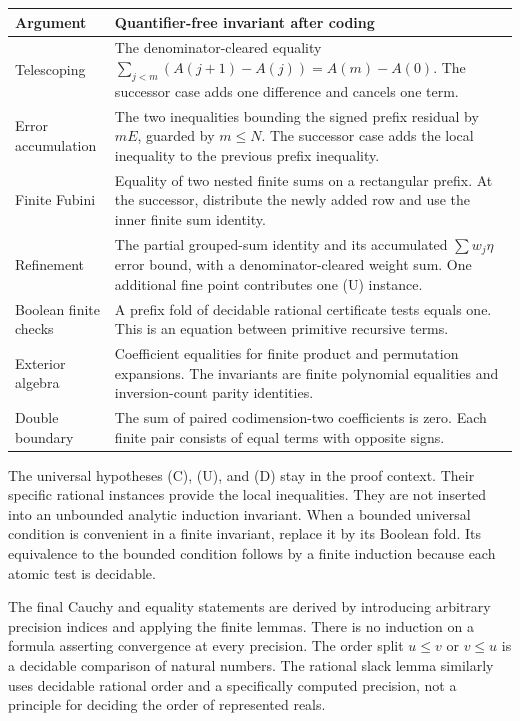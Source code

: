 \begin{longtable}{>{\raggedright\arraybackslash}p{}p{}}
\toprule
Argument & Quantifier-free invariant after coding\\
\midrule
\endhead
Telescoping &
The denominator-cleared equality
$\sum_{j<m}(A(j+1)-A(j))=A(m)-A(0)$.
The successor case adds one difference and cancels one term.\\
\addlinespace
Error accumulation &
The two inequalities bounding the signed prefix residual by $mE$,
guarded by $m\le N$. The successor case adds the local inequality to
the previous prefix inequality.\\
\addlinespace
Finite Fubini &
Equality of two nested finite sums on a rectangular prefix.
At the successor, distribute the newly added row and use the inner
finite sum identity.\\
\addlinespace
Refinement &
The partial grouped-sum identity and its accumulated
$\sum w_j\eta$ error bound, with a denominator-cleared weight sum.
One additional fine point contributes one (U) instance.\\
\addlinespace
Boolean finite checks &
A prefix fold of decidable rational certificate tests equals one.
This is an equation between primitive recursive terms.\\
\addlinespace
Exterior algebra &
Coefficient equalities for finite product and permutation expansions.
The invariants are finite polynomial equalities and inversion-count
parity identities.\\
\addlinespace
Double boundary &
The sum of paired codimension-two coefficients is zero.
Each finite pair consists of equal terms with opposite signs.\\
\bottomrule
\end{longtable}

The universal hypotheses (C), (U), and (D) stay in the proof context.
Their specific rational instances provide the local inequalities.
They are not inserted into an unbounded analytic induction invariant.
When a bounded universal condition is convenient in a finite invariant,
replace it by its Boolean fold. Its equivalence to the bounded
condition follows by a finite induction because each atomic test is
decidable.

The final Cauchy and equality statements are derived by introducing
arbitrary precision indices and applying the finite lemmas. There is no
induction on a formula asserting convergence at every precision.
The order split $u\le v$ or $v\le u$ is a decidable comparison of
natural numbers. The rational slack lemma similarly uses decidable
rational order and a specifically computed precision, not a principle
for deciding the order of represented reals.

